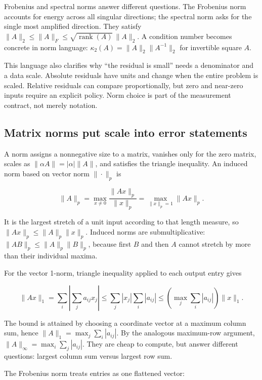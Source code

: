 Frobenius and spectral norms answer different questions. The Frobenius norm accounts for energy across all singular directions; the spectral norm asks for the single most amplified direction. They satisfy \(\|A\|_2\le\|A\|_F\le\sqrt{\operatorname{rank}(A)}\,\|A\|_2\). A condition number becomes concrete in norm language: \(\kappa_2(A)=\|A\|_2\|A^{-1}\|_2\) for invertible square \(A\).

This language also clarifies why ``the residual is small'' needs a denominator and a data scale. Absolute residuals have units and change when the entire problem is scaled. Relative residuals can compare proportionally, but zero and near-zero inputs require an explicit policy. Norm choice is part of the measurement contract, not merely notation.

\subsection{Matrix norms put scale into error statements}\label{01-foundations-i-ch019-matrix-norms-put-scale-into-error-statements}

\hypertarget{01-foundations-i-ch019-matrix-norms-put-scale-into-error-statements}{}

A norm assigns a nonnegative size to a matrix, vanishes only for the zero matrix, scales as \(\|\alpha A\|=|\alpha|\|A\|\), and satisfies the triangle inequality. An induced norm based on vector norm \(\|\cdot\|_p\) is

\[
\|A\|_p=\max_{x\ne0}\frac{\|Ax\|_p}{\|x\|_p}
=\max_{\|x\|_p=1}\|Ax\|_p.
\]

It is the largest stretch of a unit input according to that length measure, so \(\|Ax\|_p\le\|A\|_p\|x\|_p\). Induced norms are submultiplicative: \(\|AB\|_p\le\|A\|_p\|B\|_p\), because first \(B\) and then \(A\) cannot stretch by more than their individual maxima.

For the vector 1-norm, triangle inequality applied to each output entry gives

\[
\|Ax\|_1=\sum_i\left|\sum_j a_{ij}x_j\right|
\le\sum_j |x_j|\sum_i|a_{ij}|
\le \left(\max_j\sum_i|a_{ij}|\right)\|x\|_1.
\]

The bound is attained by choosing a coordinate vector at a maximum column sum, hence \(\|A\|_1=\max_j\sum_i|a_{ij}|\). By the analogous maximum-row argument, \(\|A\|_\infty=\max_i\sum_j|a_{ij}|\). They are cheap to compute, but answer different questions: largest column sum versus largest row sum.

The Frobenius norm treats entries as one flattened vector:

